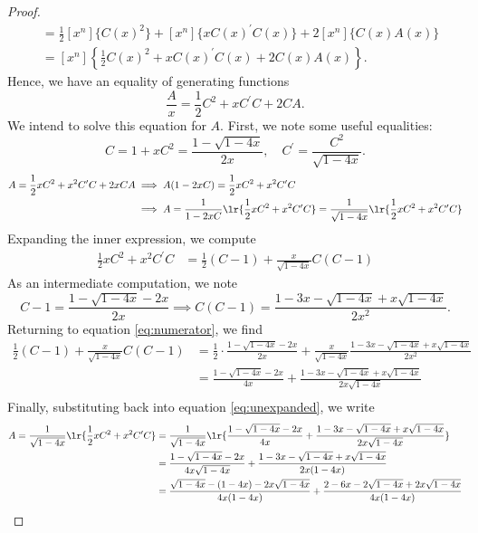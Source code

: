 \documentclass[12pt]{article}
\begin{document}
\begin{proof}
\begin{align*}
    &= \frac{1}{2}[x^{n}]\{C(x)^{2}\} + [x^{n}]\{xC(x)^{\prime}C(x)\} + 2 [x^{n}]\{C(x)A(x)\} \\
    &=[x^{n}]\left\{\frac{1}{2}C(x)^{2} + xC(x)^{\prime}C(x) + 2 C(x)A(x)\right\}. 
  \end{align*}
  Hence, we have an equality of generating functions
  \begin{equation}\label{eq:diffyq}
    \frac{A}{x} =\frac{1}{2}C^{2} + xC^{\prime}C + 2 CA.
  \end{equation}
  We intend to solve this equation for $ A $. First, we note some useful equalities:
  \[
    C = 1+xC^{2} = \frac{1-\sqrt{1-4x}}{2x},\quad C^{\prime} = \frac{C^{2}}{\sqrt{1-4x}}.
  \]
  \begin{align}\label{eq:unexpanded}
    A = \frac{1}{2}xC^{2} + x^{2}C^{\prime}C + 2xCA &\implies A(1-2xC) =  \frac{1}{2}xC^{2} + x^{2}C^{\prime}C \nonumber\\
    &\implies A=  \frac{1}{1-2xC}\lr{\frac{1}{2}xC^{2} + x^{2}C^{\prime}C} = \frac{1}{\sqrt{1-4x}}\lr{\frac{1}{2}xC^{2} + x^{2}C^{\prime}C}
  \end{align}
  Expanding the inner expression, we compute
  \begin{align}\label{eq:numerator}
    \frac{1}{2}xC^{2} + x^{2}C^{\prime}C &= \frac{1}{2}(C-1) + \frac{x}{\sqrt{1-4x}}C(C-1)
  \end{align}
  As an intermediate computation, we note
  \[
    C-1 = \frac{1-\sqrt{1-4x}-2x}{2x} \implies C(C-1) = \frac{1-3x-\sqrt{1-4x}+x \sqrt{1-4x}}{2x^{2}}.
  \]
  Returning to equation \eqref{eq:numerator}, we find
  \begin{align*}
    \frac{1}{2}(C-1) + \frac{x}{\sqrt{1-4x}}C(C-1) &= \frac{1}{2}\cdot \frac{1-\sqrt{1-4x}-2x}{2x} + \frac{x}{\sqrt{1-4x}}\frac{1-3x-\sqrt{1-4x}+x \sqrt{1-4x}}{2x^{2}}\\
    &=\frac{1-\sqrt{1-4x}-2x}{4x} + \frac{1-3x-\sqrt{1-4x}+x \sqrt{1-4x}}{2x \sqrt{1-4x}}\\
  \end{align*}
  Finally, substituting back into equation \eqref{eq:unexpanded}, we write
  \begin{align*}
    A = \frac{1}{\sqrt{1-4x}}\lr{\frac{1}{2}xC^{2} + x^{2}C^{\prime}C} &= \frac{1}{\sqrt{1-4x}}\lr{\frac{1-\sqrt{1-4x}-2x}{4x} + \frac{1-3x-\sqrt{1-4x}+x \sqrt{1-4x}}{2x \sqrt{1-4x}}} \\
    &=\frac{1-\sqrt{1-4x}-2x}{4x \sqrt{1-4x}} + \frac{1-3x-\sqrt{1-4x}+x \sqrt{1-4x}}{2x (1-4x)}\\
    &=\frac{\sqrt{1-4x}-(1-4x)-2x \sqrt{1-4x}}{4x (1-4x)} + \frac{2-6x-2\sqrt{1-4x}+2x \sqrt{1-4x}}{4x (1-4x)}\\

\end{align*}
\end{proof}
\end{document}
